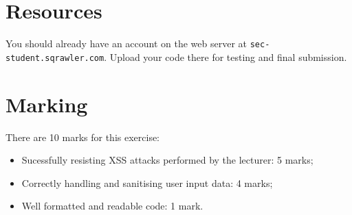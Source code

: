 \documentclass{article}
\begin{document}
\section{Resources}
You should already have an account on the web server at \texttt{sec-student.sqrawler.com}.
Upload your code there for testing and final submission.

\newpage

\section{Marking}

There are 10 marks for this exercise:

\begin{itemize}
	\item Sucessfully resisting XSS attacks performed by the lecturer: 5 marks;
	\item Correctly handling and sanitising user input data: 4 marks;
	\item Well formatted and readable code: 1 mark.
\end{itemize}
\end{document}
